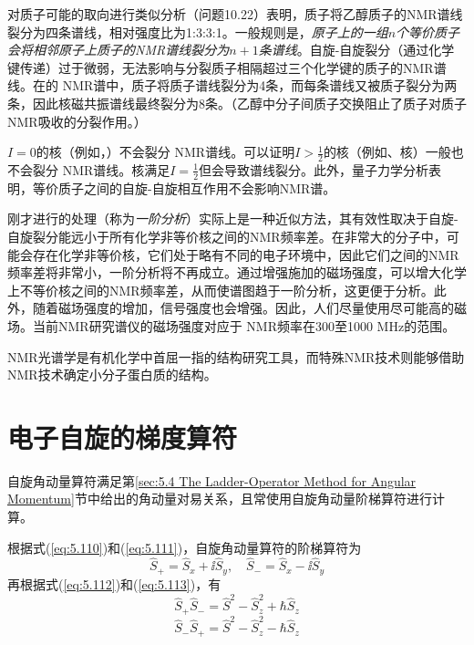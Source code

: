     对质子可能的取向进行类似分析（问题10.22）表明，质子将乙醇质子的NMR谱线裂分为四条谱线，相对强度比为1:3:3:1。一般规则是，\textit{原子上的一组$n$个等价质子会将相邻原子上质子的NMR谱线裂分为$n+1$条谱线}。自旋-自旋裂分（通过化学键传递）过于微弱，无法影响与分裂质子相隔超过三个化学键的质子的NMR谱线。在的 NMR谱中，质子将质子谱线裂分为4条，而每条谱线又被质子裂分为两条，因此核磁共振谱线最终裂分为8条。（乙醇中分子间质子交换阻止了质子对质子NMR吸收的分裂作用。）

    $I=0$的核（例如，）不会裂分 NMR谱线。可以证明$I > \frac{1}{2}$的核（例如、核）一般也不会裂分 NMR谱线。核满足$I = \frac{1}{2}$但会导致谱线裂分。此外，量子力学分析表明，等价质子之间的自旋-自旋相互作用不会影响NMR谱。

    刚才进行的处理（称为\textit{一阶分析}）实际上是一种近似方法，其有效性取决于自旋-自旋裂分能远小于所有化学非等价核之间的NMR频率差。在非常大的分子中，可能会存在化学非等价核，它们处于略有不同的电子环境中，因此它们之间的NMR频率差将非常小，一阶分析将不再成立。通过增强施加的磁场强度，可以增大化学上不等价核之间的NMR频率差，从而使谱图趋于一阶分析，这更便于分析。此外，随着磁场强度的增加，信号强度也会增强。因此，人们尽量使用尽可能高的磁场。当前NMR研究谱仪的磁场强度对应于 NMR频率在300至1000 MHz的范围。

    NMR光谱学是有机化学中首屈一指的结构研究工具，而特殊NMR技术则能够借助NMR技术确定小分子蛋白质的结构。

\section{电子自旋的梯度算符}
\label{sec:10.10 Ladder Operators for Electron Spin}

    自旋角动量算符满足第\ref{sec:5.4 The Ladder-Operator Method for Angular Momentum}节中给出的角动量对易关系，且常使用自旋角动量阶梯算符进行计算。

    根据式(\ref{eq:5.110})和(\ref{eq:5.111})，自旋角动量算符的阶梯算符为
    \begin{equation}
        \hat{S}_+ = \hat{S}_x + \ii \hat{S}_y, \quad \hat{S}_- = \hat{S}_x - \ii \hat{S}_y
        \label{eq:10.63}
    \end{equation}
    再根据式(\ref{eq:5.112})和(\ref{eq:5.113})，有
    \begin{equation}
        \hat{S}_+\hat{S}_- = \hat{S}^2 - \hat{S}_z^2 + \hbar\hat{S}_z
        \label{eq:10.64}
    \end{equation}
    \begin{equation}
        \hat{S}_-\hat{S}_+ = \hat{S}^2 - \hat{S}_z^2 - \hbar\hat{S}_z
        \label{eq:10.65}
    \end{equation}

